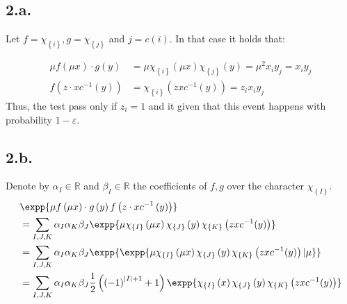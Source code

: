 \documentclass{article}
\newcommand{\Chi}[1]{\chi_{ \left\{ #1  \right\} } }
\begin{document}
\subsection{2.a.} Let $f = \Chi{i}, g = \Chi{j}$ and $j = c(i)$. In that case it holds that: 

\begin{equation*}
  \begin{split}
    \mu f\left( \mu x \right) \cdot g\left( y \right)  &= \mu \Chi{i}\left( \mu x \right)\Chi{j}\left( y \right) = \mu^{2}x_{i}y_{j} = x_{i}y_{j} \\ 
    f\left(z \cdot x c^{-1}\left( y \right)  \right) & = \Chi{i}\left( zx c^{-1}(y) \right) = z_{i}x_{i}y_{j} 
  \end{split}
\end{equation*}
Thus, the test pass only if $z_{i} = 1$ and it given that this event happens with probability $1-\varepsilon$. 

\subsection{2.b.} 
Denote by $\alpha_{I} \in \mathbb{R}$ and $\beta_{I} \in \mathbb{R}$ the coefficients of $f,g$ over the character $\Chi{I}$.  
\begin{equation*}
  \begin{split}
    & \expp{\mu f\left( \mu x \right) \cdot g\left( y \right)f\left(z \cdot x c^{-1}\left( y \right)  \right)} \\
    & = \sum_{I,J,K}\alpha_{I}\alpha_{K}\beta_{J}\expp{ \mu \Chi{I}\left( \mu x \right)\Chi{J}\left( y \right) \Chi{K}\left( zx c^{-1}(y) \right) } \\
    & = \sum_{I,J,K}\alpha_{I}\alpha_{K}\beta_{J}\expp{\expp{ \mu \Chi{I}\left( \mu x \right)\Chi{J}\left( y \right) \Chi{K}\left( zx c^{-1}(y) \right)|\mu}} \\ 
    & = \sum_{I,J,K}\alpha_{I}\alpha_{K}\beta_{J}\frac{1}{2}\left( \left( - 1 \right)^{|I|+1}  + 1\right) \expp{  \Chi{I}\left(  x \right)\Chi{J}\left( y \right) \Chi{K}\left( zx c^{-1}(y) \right) }  
  \end{split}
\end{equation*}
\end{document}
